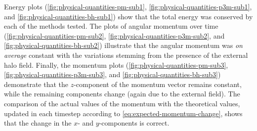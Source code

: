 Energy plots (\autoref{fig:physical-quantities-pm-sub1}, \autoref{fig:physical-quantities-p3m-sub1}, and \autoref{fig:physical-quantities-bh-sub1}) show that the total energy was conserved by each of the methods tested.
The plots of angular momentum over time (\autoref{fig:physical-quantities-pm-sub2}, \autoref{fig:physical-quantities-p3m-sub2}, and \autoref{fig:physical-quantities-bh-sub2}) illustrate that the angular momentum was \textit{on average} constant with the variations stemming from the presence of the external halo field.
Finally, the momentum plots (\autoref{fig:physical-quantities-pm-sub3}, \autoref{fig:physical-quantities-p3m-sub3}, and \autoref{fig:physical-quantities-bh-sub3}) demonstrate that the $z$-component of the momentum vector remains constant, while the remaining components change (again due to the external field).
The comparison of the actual values of the momentum with the theoretical values, updated in each timestep according to \autoref{eq:expected-momentum-change}, shows that the change in the $x$- and $y$-components is correct.
